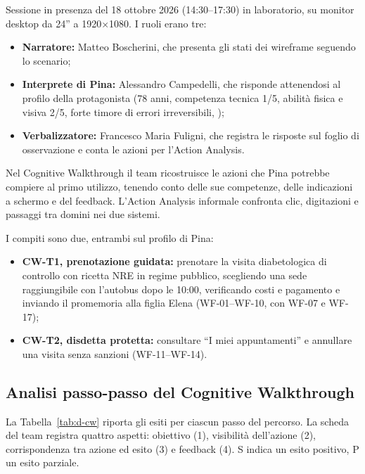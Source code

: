 Sessione in presenza del 18 ottobre 2026 (14:30--17:30) in laboratorio, su monitor desktop da 24'' a 1920$\times$1080. I ruoli erano tre:
\begin{itemize}
\item \textbf{Narratore:} Matteo Boscherini, che presenta gli stati dei wireframe seguendo lo scenario;
\item \textbf{Interprete di Pina:} Alessandro Campedelli, che risponde attenendosi al profilo della protagonista (78 anni, competenza tecnica 1/5, abilità fisica e visiva 2/5, forte timore di errori irreversibili, );
\item \textbf{Verbalizzatore:} Francesco Maria Fuligni, che registra le risposte sul foglio di osservazione e conta le azioni per l'Action Analysis.
\end{itemize}


Nel Cognitive Walkthrough il team ricostruisce le azioni che Pina potrebbe compiere al primo utilizzo, tenendo conto delle sue competenze, delle indicazioni a schermo e del feedback. L'Action Analysis informale confronta clic, digitazioni e passaggi tra domini nei due sistemi.

I compiti sono due, entrambi sul profilo di Pina:
\begin{itemize}
\item \textbf{CW-T1, prenotazione guidata:} prenotare la visita diabetologica di controllo con ricetta NRE in regime pubblico, scegliendo una sede raggiungibile con l'autobus dopo le 10:00, verificando costi e pagamento e inviando il promemoria alla figlia Elena (WF-01--WF-10, con WF-07 e WF-17);
\item \textbf{CW-T2, disdetta protetta:} consultare ``I miei appuntamenti'' e annullare una visita senza sanzioni (WF-11--WF-14).
\end{itemize}

\subsection{Analisi passo-passo del Cognitive Walkthrough}

La Tabella~\ref{tab:d-cw} riporta gli esiti per ciascun passo del percorso. La scheda del team registra quattro aspetti: obiettivo (1), visibilità dell'azione (2), corrispondenza tra azione ed esito (3) e feedback (4). S indica un esito positivo, P un esito parziale.

